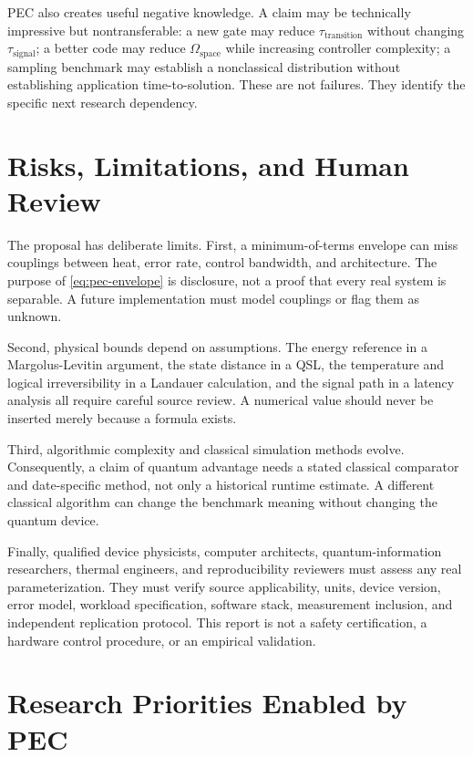 \documentclass[conference]{IEEEtran}
\begin{document}
PEC also creates useful negative knowledge. A claim may be technically
impressive but nontransferable: a new gate may reduce
\(\tau_{\mathrm{transition}}\) without changing
\(\tau_{\mathrm{signal}}\); a better code may reduce
\(\Omega_{\mathrm{space}}\) while increasing controller complexity; a
sampling benchmark may establish a nonclassical distribution without
establishing application time-to-solution. These are not failures. They
identify the specific next research dependency.

\section{Risks, Limitations, and Human Review}

The proposal has deliberate limits. First, a minimum-of-terms envelope can
miss couplings between heat, error rate, control bandwidth, and architecture.
The purpose of \eqref{eq:pec-envelope} is disclosure, not a proof that every
real system is separable. A future implementation must model couplings or
flag them as unknown.

Second, physical bounds depend on assumptions. The energy reference in a
Margolus-Levitin argument, the state distance in a QSL, the temperature and
logical irreversibility in a Landauer calculation, and the signal path in a
latency analysis all require careful source review. A numerical value should
never be inserted merely because a formula exists.

Third, algorithmic complexity and classical simulation methods evolve.
Consequently, a claim of quantum advantage needs a stated classical comparator
and date-specific method, not only a historical runtime estimate. A different
classical algorithm can change the benchmark meaning without changing the
quantum device.

Finally, qualified device physicists, computer architects,
quantum-information researchers, thermal engineers, and reproducibility
reviewers must assess any real parameterization. They must verify source
applicability, units, device version, error model, workload specification,
software stack, measurement inclusion, and independent replication protocol.
This report is not a safety certification, a hardware control procedure, or
an empirical validation.

\section{Research Priorities Enabled by PEC}
\end{document}
